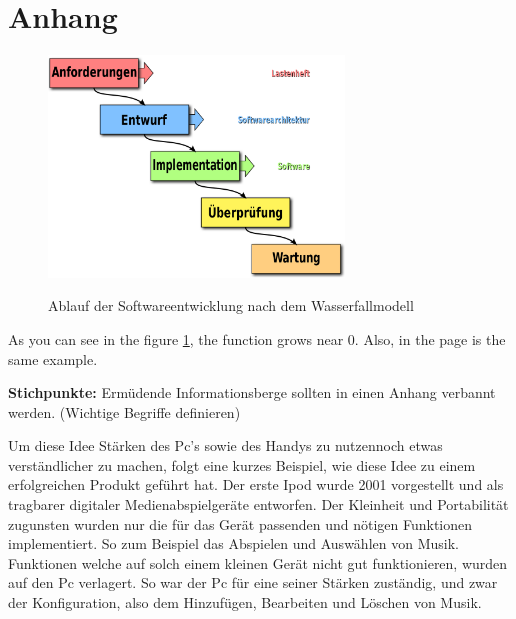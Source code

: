 \section{Anhang}

\begin{figure}[h]
    \centering
    \includegraphics[width=0.7\textwidth]{res/Waterfall_model-de.svg.png} 
    \caption{Ablauf der Softwareentwicklung nach dem Wasserfallmodell} \cite{wasserfallmodellPic}
    \label{fig:wasserfallmodell}
\end{figure}

As you can see in the figure \ref{fig:wasserfallmodell}, the 
function grows near 0. Also, in the page \pageref{fig:wasserfallmodell} 
is the same example.

\myNewSection
\textbf{Stichpunkte:} 
Ermüdende Informationsberge sollten in einen Anhang verbannt werden. (Wichtige Begriffe definieren)

\myNewSection \label{anhang:einleitung:passendeLösung}
Um diese Idee \dq Stärken des Pc's sowie des Handys zu nutzen\dq noch etwas verständlicher zu machen, folgt eine kurzes Beispiel, wie diese Idee zu einem erfolgreichen Produkt geführt hat.
Der erste Ipod\cite{einleitung_ipod} wurde 2001 vorgestellt und als \glqq tragbarer digitaler Medienabspielgeräte\grqq{} entworfen. Der Kleinheit und Portabilität zugunsten wurden nur die für das Gerät passenden und nötigen Funktionen implementiert. So zum Beispiel das Abspielen und Auswählen von Musik. Funktionen welche auf solch einem kleinen Gerät nicht gut funktionieren, wurden auf den Pc verlagert. So war der Pc für eine seiner Stärken zuständig, und zwar der Konfiguration, also dem Hinzufügen, Bearbeiten und Löschen von Musik. 